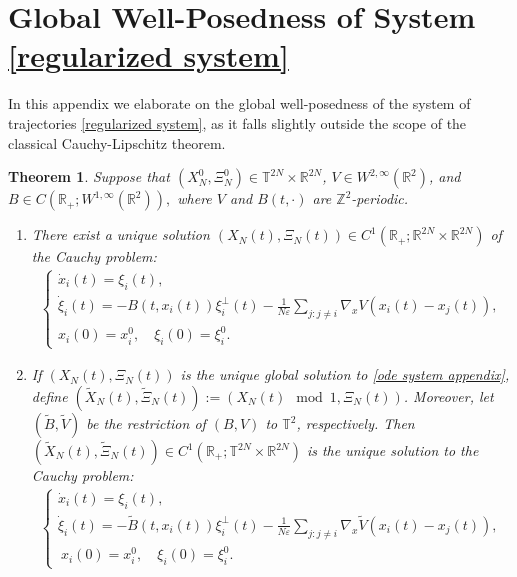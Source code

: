 \documentclass[11pt,reqno]{amsart}
\newtheorem{thm}{Theorem}[section]
\numberwithin{equation}{section}
\begin{document}
\section{Global Well-Posedness of System \eqref{regularized system}}
In this appendix we elaborate on the global well-posedness of the system of trajectories \eqref{regularized system}, as it falls slightly outside the scope of the classical Cauchy-Lipschitz theorem.  
\begin{thm}\label{periodiccauchy lip thm}
Suppose that $(X_{N}^{0},\Xi_{N}^{0})\in \mathbb{T}^{2N}\times \mathbb{R}^{2N}$, 
$V\in W^{2,\infty}(\mathbb{R}^{2})$, and $B\in C(\mathbb{R}_{+};W^{1,\infty}(\mathbb{R}^{2})),$ 
where $V$ and $B(t,\cdot)$ are $\mathbb{Z}^{2}$-periodic.
\begin{enumerate}
\item[{\rm(i)}] There exist a unique solution $(X_{N}(t),\Xi_{N}(t))\in C^{1}(\mathbb{R}_{+};\mathbb{R}^{2N}\times \mathbb{R}^{2N})$ of the Cauchy problem{\rm :} 
\begin{align}
\begin{cases}
\dot x_{i}(t)=\xi_{i}(t),\\
\dot \xi_{i}(t)=-B(t,x_{i}(t))\xi_{i}^{\perp}(t)-\frac{1}{N\varepsilon}\underset{j:j\neq i}{\sum}\nabla_{x} V(x_{i}(t)-x_{j}(t)),\\
x_{i}(0)=x_{i}^{0}, \quad \xi_{i}(0)=\xi_{i}^{0}. 
\end{cases}
\label{ode system appendix}
\end{align}
\item[{\rm(ii)}] If $(X_{N}(t),\Xi_{N}(t))$ is the unique global solution to \eqref{ode system appendix}, define $(\widetilde{X}_{N}(t),\widetilde{\Xi}_{N}(t)):= (X_{N}(t)\mod 1,\Xi_{N}(t))$. Moreover, let $(\widetilde{B},\widetilde{V})$ be the restriction of $(B,V)$ 
to $\mathbb{T}^{2}$, respectively.  
Then $(\widetilde{X}_{N}(t),\widetilde{\Xi}_{N}(t))\in C^{1}(\mathbb{R}_{+};\mathbb{T}^{2N}\times \mathbb{R}^{2N})$  is the unique solution to the Cauchy problem{\rm:} 
\begin{align}
\begin{cases}
\dot x_{i}(t)=\xi_{i}(t),\\
\dot \xi_{i}(t)=-\widetilde{B}(t,x_{i}(t))\xi_{i}^{\perp}(t)-\frac{1}{N\varepsilon}\underset{j:j\neq i}{\sum}\nabla_{x} \widetilde{V}(x_{i}(t)-x_{j}(t)), \\
\ x_{i}(0)=x_{i}^{0},\quad \xi_{i}(0)=\xi_{i}^{0}. 
\end{cases}
\label{ode system appendix torus}
\end{align}
\end{enumerate}
\end{thm}
\end{document}
